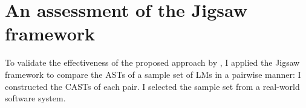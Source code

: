 \section{An assessment of the Jigsaw framework}\label{jigsaw-assessment}
%
%
%
%



To validate the effectiveness of the proposed approach by \citet{2008:fse:cottrell}, I applied the Jigsaw framework to compare the ASTs of a sample set of LMs in a pairwise manner: I constructed the CASTs of each pair. I selected the sample set from a real-world software system. %


